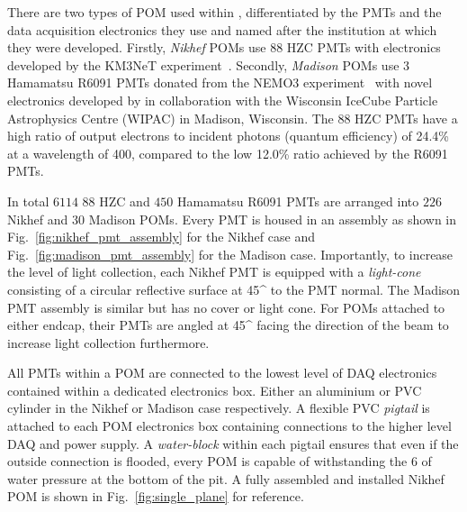 There are two types of POM used within \chipsfive, differentiated by the PMTs and the data
acquisition electronics they use and named after the institution at which they were developed.
Firstly, \emph{Nikhef} POMs use \unit{88}{} HZC PMTs with electronics developed by the
KM3NeT experiment~\cite{katz2009, adrian2016}. Secondly, \emph{Madison} POMs use
\unit{3}{} Hamamatsu R6091 PMTs donated from the NEMO3 experiment~\cite{arnold2005}
with novel electronics developed by \chips in collaboration with the Wisconsin IceCube Particle
Astrophysics Centre (WIPAC) in Madison, Wisconsin. The \unit{88}{} HZC PMTs have a high
ratio of output electrons to incident photons (quantum efficiency) of 24.4\% at a wavelength of
\unit{400}{}, compared to the low 12.0\% ratio achieved by the R6091 PMTs.

In total $6114$ \unit{88}{} HZC and $450$ Hamamatsu R6091 PMTs are arranged into $226$
Nikhef and $30$ Madison POMs. Every PMT is housed in an assembly as shown in
Fig.~\ref{fig:nikhef_pmt_assembly} for the Nikhef case and Fig.~\ref{fig:madison_pmt_assembly} for
the Madison case. Importantly, to increase the level of light collection, each Nikhef PMT is
equipped with a \emph{light-cone} consisting of a circular reflective surface at \unit{45}{^\circ}
to the PMT normal. The Madison PMT assembly is similar but has no cover or light cone. For POMs
attached to either endcap, their PMTs are angled at \unit{45}{^\circ} facing the direction of the
beam to increase light collection furthermore.

All PMTs within a POM are connected to the lowest level of DAQ electronics contained within a
dedicated electronics box. Either an aluminium or PVC cylinder in the Nikhef or Madison case
respectively. A flexible PVC \emph{pigtail} is attached to each POM electronics box containing
connections to the higher level DAQ and power supply. A \emph{water-block} within each pigtail
ensures that even if the outside connection is flooded, every POM is capable of withstanding the
\unit{6}{} of water pressure at the bottom of the pit. A fully assembled and installed
Nikhef POM is shown in Fig.~\ref{fig:single_plane} for reference.

